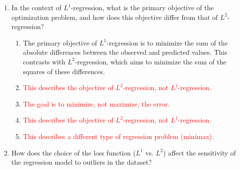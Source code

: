 \documentclass{article}%
\newcommand{\incorrect}[1]{\textcolor{red}{#1}}
\begin{document}
\begin{enumerate}
\begin{enumerate}%
\item The $L^1$ norm (sum of absolute errors) is less sensitive to outliers than the $L^2$ norm (sum of squared errors).  Large errors are penalized less severely in $L^1$ regression, making it more robust to outliers that might disproportionately influence the $L^2$ regression line.%
\item \incorrect{This statement incorrectly describes the effect of the $L^1$ loss function.  The absolute value penalizes large errors less than squaring them.}%
\item \incorrect{This is incorrect. The $L^1$ and $L^2$ loss functions have different sensitivities to outliers due to the different ways they penalize errors.}%
\item \incorrect{While the dataset's characteristics play a role, the choice of loss function significantly impacts outlier sensitivity. $L^1$ is inherently more robust.}%
\item \incorrect{The sensitivity of $L^1$ regression to outliers is not dependent on a specific threshold of the number of outliers relative to the data points.}%
\end{enumerate}%
\vspace{1em}%
\item In the context of $L^1$-regression, what is the primary objective of the optimization problem, and how does this objective differ from that of $L^2$-regression?%
\begin{enumerate}%
\item The primary objective of $L^1$-regression is to minimize the sum of the absolute differences between the observed and predicted values. This contrasts with $L^2$-regression, which aims to minimize the sum of the squares of these differences.%
\item \incorrect{This describes the objective of $L^2$-regression, not $L^1$-regression.}%
\item \incorrect{The goal is to minimize, not maximize, the error.}%
\item \incorrect{This describes the objective of $L^2$-regression, not $L^1$-regression.}%
\item \incorrect{This describes a different type of regression problem (minimax).}%
\end{enumerate}%
\vspace{1em}%
\item How does the choice of the loss function ($L^1$ vs. $L^2$) affect the sensitivity of the regression model to outliers in the dataset?%

\end{enumerate}
\end{document}
